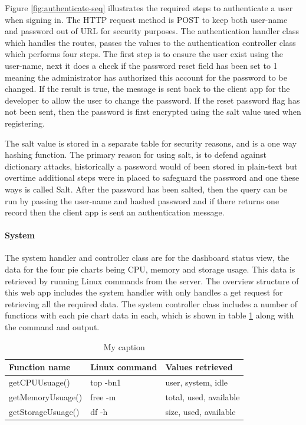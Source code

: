 Figure \ref{fig:authenticate-seq} illustrates the required steps to authenticate a user when signing in. The HTTP request method is POST to keep both user-name and password out of URL for security purposes. The authentication handler class which handles the routes, passes the values to the authentication controller class which performs four steps. The first step is to ensure the user exist using the user-name, next it does a check if the password reset field has been set to 1 meaning the administrator has authorized this account for the password to be changed. If the result is true, the message is sent back to the client app for the developer to allow the user to change the password. If the reset password flag has not been sent, then the password is first encrypted using the salt value used when registering. 

The salt value is stored in a separate table for security reasons, and is a one way hashing function. The primary reason for using salt, is to defend against dictionary attacks, historically a password would of been stored in plain-text but overtime additional steps were in placed to safeguard the password and one these ways is called Salt. After the password has been salted, then the query can be run by passing the user-name and hashed password and if there returns one record then the client app is sent an authentication message. 

\paragraph{System}

The system handler and controller class are for the dashboard status view, the data for the four pie charts being CPU, memory and storage usage. This data is retrieved by running Linux commands from the server. The overview structure of this web app includes the system handler with only handles a get request for retrieving all the required data. The system controller class includes a number of functions with each pie chart data in each, which is shown in table \ref{tb:system} along with the command and output. 

\begin{table}[!h]
\centering
\caption{My caption}
\label{tb:system}
\begin{tabular}{|l|l|l|}
\hline
\rowcolor{green!20}
Function name    & Linux command & Values retrieved       \\ \hline
getCPUUsuage()     & top -bn1      & user, system, idle     \\ \hline
getMemoryUsuage()  & free -m       & total, used, available \\ \hline
getStorageUsuage() & df -h         & size, used, available  \\ \hline
\end{tabular}
\end{table}

